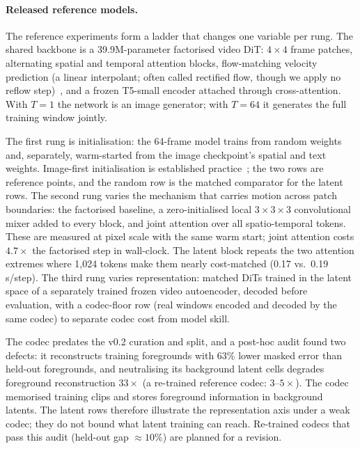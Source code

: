 \documentclass[10pt,twocolumn]{article}
\begin{document}
\paragraph{Released reference models.} The reference experiments form a ladder that changes one variable per
rung. The shared backbone is a 39.9M-parameter factorised video DiT: $4\times4$ frame patches, alternating
spatial and temporal attention blocks, flow-matching velocity prediction (a linear interpolant; often called
rectified flow, though we apply no reflow step)~\cite{peebles2023dit,lipman2023flow}, and a frozen T5-small
encoder attached through cross-attention. With $T{=}1$ the network is an image generator; with $T{=}64$ it
generates the full training window jointly.

The first rung is initialisation: the 64-frame model trains from random weights and, separately, warm-started
from the image checkpoint's spatial and text weights. Image-first initialisation is established
practice~\cite{ho2022vdm,singer2023makeavideo}; the two rows are reference points, and the random row is the
matched comparator for the latent rows. The second rung varies the mechanism that carries motion across patch
boundaries: the factorised baseline, a zero-initialised local $3{\times}3{\times}3$ convolutional mixer added
to every block, and joint attention over all spatio-temporal tokens. These are measured at pixel scale with the
same warm start; joint attention costs $4.7\times$ the factorised step in wall-clock. The latent block repeats
the two attention extremes where 1{,}024 tokens make them nearly cost-matched (0.17 vs.\ 0.19\,s/step). The
third rung varies representation: matched DiTs trained in the latent space of a separately trained frozen video
autoencoder, decoded before evaluation, with a codec-floor row (real windows encoded and decoded by the same
codec) to separate codec cost from model skill.

The codec predates the v0.2 curation and split, and a post-hoc audit found two defects: it reconstructs
training foregrounds with $63\%$ lower masked error than held-out foregrounds, and neutralising its background
latent cells degrades foreground reconstruction $33\times$ (a re-trained reference codec: $3$--$5\times$). The
codec memorised training clips and stores foreground information in background latents. The latent rows
therefore illustrate the representation axis under a weak codec; they do not bound what latent training can
reach. Re-trained codecs that pass this audit (held-out gap ${\approx}10\%$) are planned for a revision.
\end{document}
